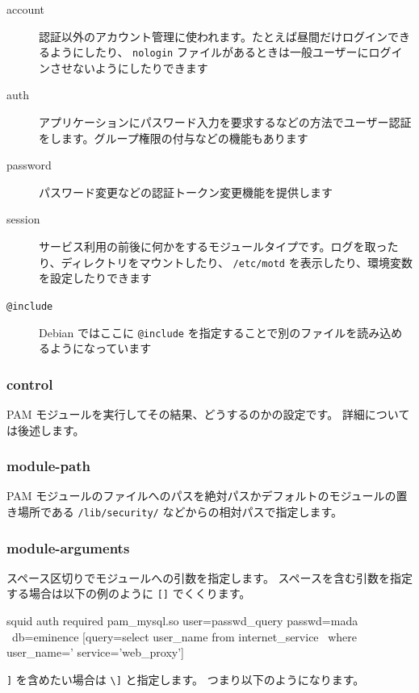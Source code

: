 \documentclass[mingoth,a4paper]{jsarticle}
\begin{document}
\begin{description}
\item[account] 認証以外のアカウント管理に使われます。たとえば昼間だけログインできるようにしたり、 \verb~nologin~ ファイルがあるときは一般ユーザーにログインさせないようにしたりできます
\item[auth] アプリケーションにパスワード入力を要求するなどの方法でユーザー認証をします。グループ権限の付与などの機能もあります
\item[password] パスワード変更などの認証トークン変更機能を提供します
\item[session] サービス利用の前後に何かをするモジュールタイプです。ログを取ったり、ディレクトリをマウントしたり、 \verb~/etc/motd~ を表示したり、環境変数を設定したりできます
\item[\verb~@include~] Debian ではここに \verb~@include~ を指定することで別のファイルを読み込めるようになっています
\end{description}
\subsubsection{control}
\label{sec-1-3-3}

PAM モジュールを実行してその結果、どうするのかの設定です。
詳細については後述します。
\subsubsection{module-path}
\label{sec-1-3-4}

PAM モジュールのファイルへのパスを絶対パスかデフォルトのモジュールの置き場所である \verb~/lib/security/~ などからの相対パスで指定します。
\subsubsection{module-arguments}
\label{sec-1-3-5}

スペース区切りでモジュールへの引数を指定します。
スペースを含む引数を指定する場合は以下の例のように \verb~[]~ でくくります。


\begin{commandline}
squid auth required pam_mysql.so user=passwd_query passwd=mada \
      db=eminence [query=select user_name from internet_service \
      where user_name='%
      service='web_proxy']
\end{commandline}

\verb~]~ を含めたい場合は \verb~\]~ と指定します。
つまり以下のようになります。
\end{document}
